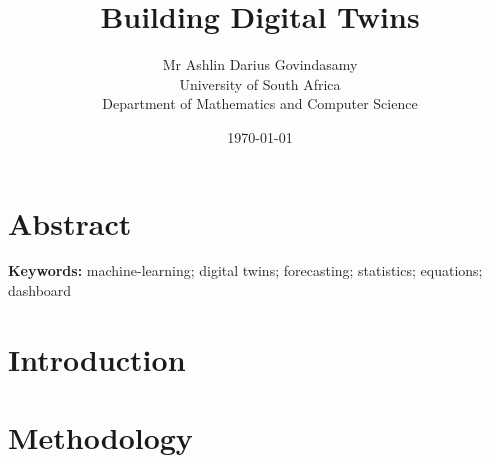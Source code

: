 \documentclass[12pt]{report}
\title{Building Digital Twins}
\author{Mr Ashlin Darius Govindasamy\\ \large{University of South Africa}\\ \small{Department of Mathematics and Computer Science}}
\date{\today}
\begin{document}
\maketitle
\newpage
{} 

\chapter*{Abstract}


\textbf{Keywords:} machine-learning; digital twins; forecasting; statistics; equations; dashboard




\tableofcontents

\chapter{Introduction}


\chapter{Methodology}


\newpage

 
 
\end{document}
